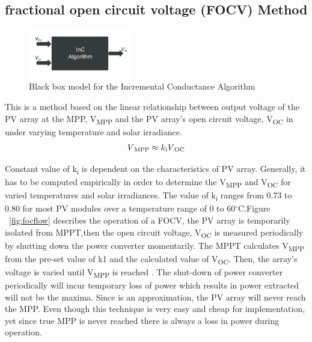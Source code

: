 {  \subsection{fractional open circuit voltage (FOCV) Method  }
  
   \begin{figure}[H]
           \begin{center}
           \includegraphics[width=0.4\textwidth]{images/Frac_block}
           \caption{ Black box model for the Incremental Conductance Algorithm }
           \label{fig:Frac_block}
      \end{center}
    \end{figure}
  This is a method based on the linear relationship between output voltage of the PV array at the \ac{MPP}, V\textsubscript{MPP} and the PV array's open circuit voltage, V\textsubscript{OC} in under varying temperature and solar irradiance. \\
  
  \begin{equation}
    \begin{aligned}
  V\textsubscript{MPP}\approx k\textsubscript{i}V\textsubscript{OC}
  \label{eq:equ_fracoc}
  \end{aligned}
  \end{equation}
  
  Constant value of k\textsubscript{i} is dependent on the characteristics of PV array. Generally, it has to be computed empirically in order to determine the V\textsubscript{MPP} and V\textsubscript{OC} for varied temperatures and solar irradiances. The value of k\textsubscript{i} ranges from 0.73 to 0.80  for most PV modules over a temperature range of 0 to 60$^\circ$C.Figure ~\ref{fig:focflow} describes the operation of a \ac{FOCV}, the PV array is temporarily isolated from \ac{MPPT},then the open circuit voltage, V\textsubscript{OC} is measured periodically by shutting down the power converter momentarily. The \ac{MPPT} calculates V\textsubscript{MPP} from the pre-set value of k1 and the calculated value of V\textsubscript{OC}. Then, the array's voltage is varied until V\textsubscript{MPP} is  reached . The shut-down of power converter periodically will incur temporary loss of power which results in power extracted will not be the maxima. Since is an approximation, the PV array will never reach the \ac{MPP}. Even though this technique is very easy and cheap for implementation, yet since true \ac{MPP} is never reached there is always a loss in power during operation\cite{ngan2011study}.
  
}

